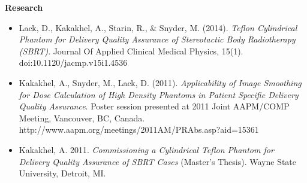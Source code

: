 \documentclass[letterpaper,10pt]{article}
\newcommand{\resheading}[1]{{\large \colorbox{mygrey}{\begin{minipage}{\textwidth}{\textbf{#1 \vphantom{p\^{E}}}}\end{minipage}}}}
\begin{document}
\resheading{Research}
	\begin{itemize} \itemsep -2pt %
	    \item {\footnotesize Lack, D., Kakakhel, A., Starin, R., \& Snyder, M. (2014). \textit{Teflon Cylindrical Phantom for Delivery Quality Assurance of Stereotactic Body Radiotherapy (SBRT)}. Journal Of Applied Clinical Medical Physics, 15(1). doi:10.1120/jacmp.v15i1.4536}
	    \item {\footnotesize Kakakhel, A., Snyder, M., Lack, D. (2011). \textit{Applicability of Image Smoothing for Dose Calculation of High Density Phantoms in Patient Specific Delivery Quality Assurance}. Poster session presented at 2011 Joint AAPM/COMP Meeting, Vancouver, BC, Canada. http://www.aapm.org/meetings/2011AM/PRAbs.asp?aid=15361}
	    \item {\footnotesize Kakakhel, A. 2011. \textit{Commissioning a Cylindrical Teflon Phantom for Delivery Quality Assurance of SBRT Cases} (Master's Thesis). Wayne State University, Detroit, MI.}
	\end{itemize}

\end{document}
